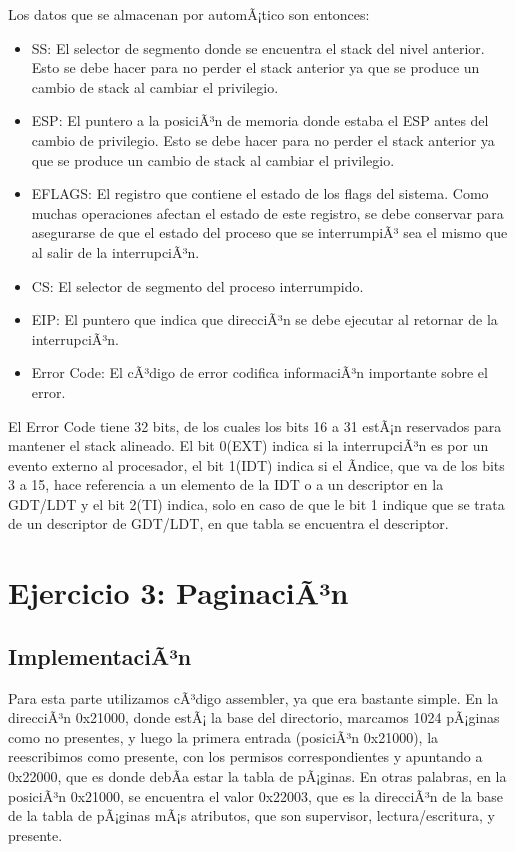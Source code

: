\documentclass[10pt, a4paper]{article}
\begin{document}
Los datos que se almacenan por automÃ¡tico son entonces:
\begin{itemize}
	\item SS: El selector de segmento donde se encuentra el stack del nivel anterior. Esto se debe hacer para no perder el stack anterior ya que se produce un cambio de stack al cambiar el privilegio.
	\item ESP: El puntero a la posiciÃ³n de memoria donde estaba el ESP antes del cambio de privilegio. Esto se debe hacer para no perder el stack anterior ya que se produce un cambio de stack al cambiar el privilegio.
	\item EFLAGS: El registro que contiene el estado de los flags del sistema. Como muchas operaciones afectan el estado de este registro, se debe conservar para asegurarse de que el estado del proceso que se interrumpiÃ³ sea el mismo que al salir de la interrupciÃ³n.
	\item CS: El selector de segmento del proceso interrumpido.
	\item EIP: El puntero que indica que direcciÃ³n se debe ejecutar al retornar de la interrupciÃ³n.
	\item Error Code: El cÃ³digo de error codifica informaciÃ³n importante sobre el error.
\end{itemize}

El Error Code tiene 32 bits, de los cuales los bits 16 a 31 estÃ¡n reservados para mantener el stack alineado. El bit 0(EXT) indica si la interrupciÃ³n es por un evento externo al procesador, el bit 1(IDT) indica si el Ã­ndice, que va de los bits 3 a 15, hace referencia a un elemento de la IDT o a un descriptor en la GDT/LDT y el bit 2(TI) indica, solo en caso de que le bit 1 indique que se trata de un descriptor de GDT/LDT, en que tabla se encuentra el descriptor.


\section{Ejercicio 3: PaginaciÃ³n}
\subsection{ImplementaciÃ³n}
Para esta parte utilizamos cÃ³digo assembler, ya que era bastante simple. En la direcciÃ³n 0x21000, donde estÃ¡ la base del directorio, marcamos 1024 pÃ¡ginas como no presentes, y luego la primera entrada (posiciÃ³n 0x21000), la reescribimos como presente, con los permisos correspondientes y apuntando a 0x22000, que es donde debÃ­a estar la tabla de pÃ¡ginas. En otras palabras, en la posiciÃ³n 0x21000, se encuentra el valor 0x22003, que es la direcciÃ³n de la base de la tabla de pÃ¡ginas mÃ¡s atributos, que son supervisor, lectura/escritura, y presente.
\end{document}
